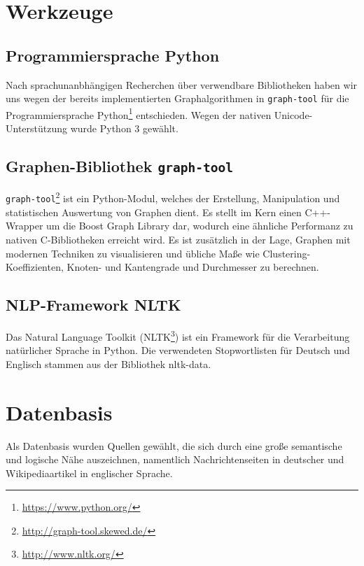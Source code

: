 \documentclass[11pt, a4paper]{article}
\begin{document}


\section{Werkzeuge}

\subsection{Programmiersprache Python}
Nach sprachunanbhängigen Recherchen über verwendbare Bibliotheken haben wir uns
wegen der bereits implementierten Graphalgorithmen in \texttt{graph-tool} für
die Programmiersprache Python\footnote{\url{https://www.python.org/}}
entschieden.
Wegen der nativen Unicode-Unterstützung wurde Python 3 gewählt.

\subsection{Graphen-Bibliothek \texttt{graph-tool}}
\texttt{graph-tool}\footnote{\url{http://graph-tool.skewed.de/}} ist ein
Python-Modul, welches der Erstellung, Manipulation und statistischen
Auswertung von Graphen dient. Es stellt im Kern einen C++-Wrapper um die Boost
Graph Library dar, wodurch eine \"ahnliche Performanz zu nativen C-Bibliotheken
erreicht wird. Es ist zus\"atzlich in der Lage, Graphen mit modernen Techniken
zu visualisieren und \"ubliche Ma\ss{}e wie Clustering-Koeffizienten, Knoten-
und Kantengrade und Durchmesser zu berechnen.

\subsection{NLP-Framework NLTK}
Das Natural Language Toolkit (NLTK\footnote{\url{http://www.nltk.org/}}) ist
ein Framework f\"ur die Verarbeitung natürlicher Sprache in Python.
Die verwendeten Stopwortlisten für Deutsch und Englisch stammen aus der
Bibliothek nltk-data.


\section{Datenbasis}

Als Datenbasis wurden Quellen gew\"ahlt, die sich durch eine gro\ss{}e
semantische und logische N\"ahe auszeichnen, namentlich Nachrichtenseiten in
deutscher und Wikipediaartikel in englischer Sprache.
\end{document}
